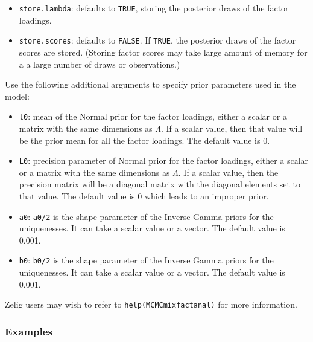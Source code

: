 \begin{itemize}
\item \texttt{store.lambda}: defaults to {\tt TRUE}, storing the
posterior draws of the factor loadings.  

\item \texttt{store.scores}: defaults to {\tt FALSE}.  If {\tt TRUE},
the posterior draws of the factor scores are stored. (Storing factor
scores may take large amount of memory for a a large number of draws
or observations.)

\end{itemize}
Use the following additional arguments to specify prior parameters used in the model:
\begin{itemize}

\item \texttt{l0}: mean of the Normal prior for the factor
loadings, either a scalar or a matrix with the same dimensions as
$\Lambda$.  If a scalar value, then that value will be the prior mean
for all the factor loadings. The default value is 0.

\item \texttt{L0}: precision parameter of Normal prior for the factor
loadings, either a scalar or a matrix with the same dimensions as $\Lambda$.  
If a scalar value, then the precision matrix will be 
a diagonal matrix with the diagonal elements set to that value. 
The default value is 0 which leads to an improper prior.

\item \texttt{a0}: {\tt a0/2} is the shape parameter of the Inverse Gamma priors for 
the uniquenesses. It can take a scalar value or a vector. The default
value is 0.001.

\item \texttt{b0}: {\tt b0/2} is the shape parameter of the Inverse Gamma priors for 
the uniquenesses. It can take a scalar value or a vector. The default
value is 0.001.

\end{itemize}
Zelig users may wish to refer to \texttt{help(MCMCmixfactanal)} for more 
information.



\subsubsection{Examples}

